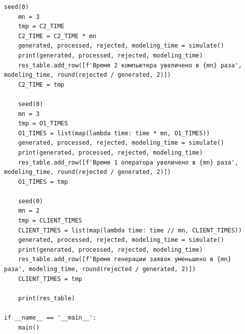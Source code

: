 \documentclass[14pt, a4paper]{extarticle}
\begin{document}
\begin{lstlisting}[caption = {Код разработанной программы}, label=lst:list1]
	seed(0)
	mn = 3
	tmp = C2_TIME
	C2_TIME = C2_TIME * mn
	generated, processed, rejected, modeling_time = simulate()
	print(generated, processed, rejected, modeling_time)
	res_table.add_row([f'Время 2 компьютера увеличено в {mn} раза', modeling_time, round(rejected / generated, 2)])
	C2_TIME = tmp
	
	seed(0)
	mn = 3
	tmp = O1_TIMES
	O1_TIMES = list(map(lambda time: time * mn, O1_TIMES))
	generated, processed, rejected, modeling_time = simulate()
	print(generated, processed, rejected, modeling_time)
	res_table.add_row([f'Время 1 оператора увеличено в {mn} раза', modeling_time, round(rejected / generated, 2)])
	O1_TIMES = tmp
	
	seed(0)
	mn = 2
	tmp = CLIENT_TIMES
	CLIENT_TIMES = list(map(lambda time: time // mn, CLIENT_TIMES))
	generated, processed, rejected, modeling_time = simulate()
	print(generated, processed, rejected, modeling_time)
	res_table.add_row([f'Время генерации заявок уменьшено в {mn} раза', modeling_time, round(rejected / generated, 2)])
	CLIENT_TIMES = tmp

	print(res_table)

if __name__ == '__main__':
	main()
\end{lstlisting}
\end{document}
